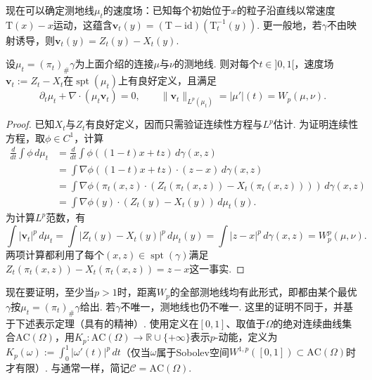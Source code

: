 现在可以确定测地线$\mu_t$的速度场：已知每个初始位于$x$的粒子沿直线以常速度$\mathrm T(x)-x$运动，这蕴含$\mathbf v_t(y)=(\mathrm T-\mathrm{id})(\mathrm T_t^{-1}(y))$. 更一般地，若$\gamma$不由映射诱导，则$\mathbf v_t(y)=Z_t(y)-X_t(y)$.

\begin{proposition}\label{obj:5.30}
设$\mu_t=(\pi_t)_\#\gamma$为上面介绍的连接$\mu$与$\nu$的测地线. 则对每个$t\in]0,1[$，速度场$\mathbf v_t:=Z_t-X_t$在$\operatorname{spt}(\mu_t)$上有良好定义，且满足
\[
\partial_t\mu_t+\nabla\cdot(\mu_t\mathbf v_t)=0,
\qquad\|\mathbf v_t\|_{L^p(\mu_t)}=|\mu'|(t)=W_p(\mu,\nu).
\]
\end{proposition}
\begin{proof}
已知$X_t$与$Z_t$有良好定义，因而只需验证连续性方程与$L^p$估计. 为证明连续性方程，取$\phi\in C^1$，计算
\[
\begin{aligned}
\frac d{dt}\int\phi\,d\mu_t
&=\frac d{dt}\int\phi((1-t)x+tz)\,d\gamma(x,z)\\
&=\int\nabla\phi((1-t)x+tz)\cdot(z-x)\,d\gamma(x,z)\\
&=\int\nabla\phi(\pi_t(x,z)\cdot(Z_t(\pi_t(x,z))-X_t(\pi_t(x,z))))\,d\gamma(x,z)\\
&=\int\nabla\phi(y)\cdot(Z_t(y)-X_t(y))\,d\mu_t(y).
\end{aligned}
\]
为计算$L^p$范数，有
\[
\int|\mathbf v_t|^p\,d\mu_t
=\int|Z_t(y)-X_t(y)|^p\,d\mu_t(y)
=\int|z-x|^p\,d\gamma(x,z)=W_p^p(\mu,\nu).
\]
两项计算都利用了每个$(x,z)\in\operatorname{spt}(\gamma)$满足$Z_t(\pi_t(x,z))-X_t(\pi_t(x,z))=z-x$这一事实.
\end{proof}

\label{idx:root5-p205-kinetic}现在要证明，至少当$p>1$时，距离$W_p$的全部测地线均有此形式，即都由某个最优$\gamma$按$\mu_t=(\pi_t)_\#\gamma$给出. 若$\gamma$不唯一，测地线也仍不唯一. 这里的证明不同于\cite{b15}，并基于下述表示定理（具有\cite{b212}的精神）. 使用定义在$[0,1]$、取值于$\Omega$的绝对连续曲线集合$\mathrm{AC}(\Omega)$，用$K_p:\mathrm{AC}(\Omega)\to\mathbb R\cup\{+\infty\}$表示$p$-动能，定义为$K_p(\omega):=\int_0^1|\omega'(t)|^p\,dt$（仅当$\omega$属于Sobolev空间$W^{1,p}([0,1])\subset\mathrm{AC}(\Omega)$时才有限）. 与通常一样，简记$\mathscr C=\mathrm{AC}(\Omega)$.

